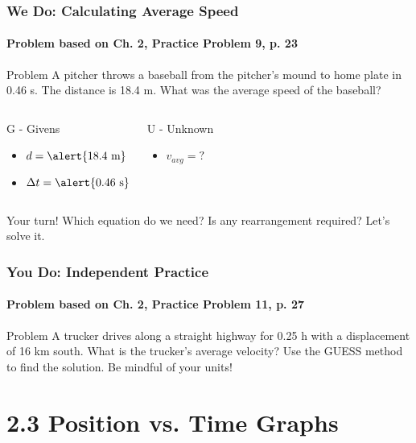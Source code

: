 \documentclass{beamer}
\begin{document}
\begin{frame}
\frametitle{We Do: Calculating Average Speed}
\framesubtitle{Problem based on Ch. 2, Practice Problem 9, p. 23}
\begin{block}{Problem}
A pitcher throws a baseball from the pitcher's mound to home plate in 0.46 s. The distance is 18.4 m. What was the average speed of the baseball?
\end{block}
\pause
\begin{columns}[T]
\begin{block}{G - Givens}
\begin{itemize}
    \item $d = \alert{18.4 \text{ m}}$
    \item $\Delta t = \alert{0.46 \text{ s}}$
\end{itemize}
\end{block}
\begin{block}{U - Unknown}
\begin{itemize}
    \item $v_{avg} = ?$
\end{itemize}
\end{block}
\end{columns}
\pause
\begin{alertblock}{Your turn!}
Which equation do we need? Is any rearrangement required? Let's solve it.
\end{alertblock}
\end{frame}

\begin{frame}
\frametitle{You Do: Independent Practice}
\framesubtitle{Problem based on Ch. 2, Practice Problem 11, p. 27}
\begin{block}{Problem}
A trucker drives along a straight highway for 0.25 h with a displacement of 16 km south. What is the trucker's average velocity?
\newline\newline
Use the GUESS method to find the solution. Be mindful of your units!
\end{block}
\end{frame}

\section{2.3 Position vs. Time Graphs}
\end{document}
